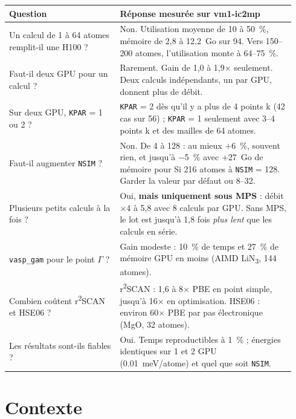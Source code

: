 \documentclass[11pt,a4paper]{article}
\newcommand{\rscan}{r\textsuperscript{2}SCAN}
\begin{document}
\begin{center}
\small
\begin{tabular}{@{}p{0.36\linewidth}p{0.58\linewidth}@{}}
\toprule
Question & Réponse mesurée sur vm1-ic2mp \\
\midrule
Un calcul de 1 à 64 atomes remplit-il une H100 ? &
Non. Utilisation moyenne de 10 à \SI{50}{\percent}, mémoire de 2,8 à \SI{12,2}{Go} sur 94.
Vers 150--200 atomes, l'utilisation monte à 64--\SI{75}{\percent}. \\
\addlinespace
Faut-il deux GPU pour un calcul ? &
Rarement. Gain de 1,0 à 1,9$\times$ seulement. Deux calculs indépendants, un par GPU,
donnent plus de débit. \\
\addlinespace
Sur deux GPU, \texttt{KPAR} = 1 ou 2 ? &
\texttt{KPAR} = 2 dès qu'il y a plus de 4 points k (42 cas sur 56) ;
\texttt{KPAR} = 1 seulement avec 3--4 points k et des mailles de 64 atomes. \\
\addlinespace
Faut-il augmenter \texttt{NSIM} ? &
Non. De 4 à 128 : au mieux $+$\SI{6}{\percent}, souvent rien, et jusqu'à
$-$\SI{5}{\percent} avec $+$\SI{27}{Go} de mémoire pour Si 216 atomes à \texttt{NSIM} = 128.
Garder la valeur par défaut ou 8--32. \\
\addlinespace
Plusieurs petits calculs à la fois ? &
Oui, \textbf{mais uniquement sous MPS} : débit $\times$4 à 5,8 avec 8 calculs par GPU.
Sans MPS, le lot est jusqu'à 1,8 fois \emph{plus lent} que les calculs en série. \\
\addlinespace
\texttt{vasp\_gam} pour le point $\Gamma$ ? &
Gain modeste : \SI{10}{\percent} de temps et \SI{27}{\percent} de mémoire GPU en moins
(AIMD LiN\textsubscript{3}, 144 atomes). \\
\addlinespace
Combien coûtent \rscan{} et HSE06 ? &
\rscan{} : 1,6 à 8$\times$ PBE en point simple, jusqu'à 16$\times$ en optimisation.
HSE06 : environ 60$\times$ PBE par pas électronique (MgO, 32 atomes). \\
\addlinespace
Les résultats sont-ils fiables ? &
Oui. Temps reproductibles à \SI{1}{\percent} ; énergies identiques sur 1 et 2 GPU
(\SI{0,01}{meV/atome}) et quel que soit \texttt{NSIM}. \\
\bottomrule
\end{tabular}
\end{center}

\tableofcontents

\section{Contexte}
\label{sec:contexte}
\end{document}
